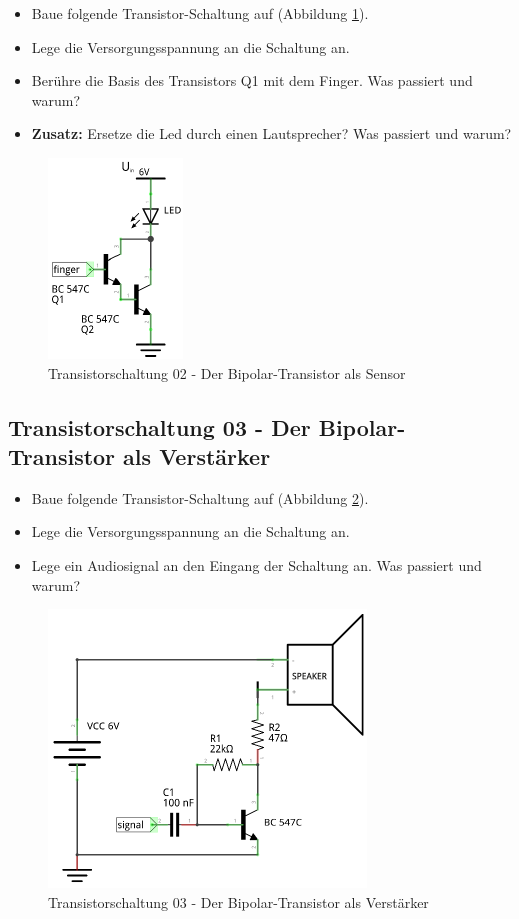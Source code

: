 \begin{itemize}
\itemsep1pt\parskip0pt
\item Baue folgende Transistor-Schaltung auf (Abbildung \ref{s02}). 
\item Lege die Versorgungsspannung an die Schaltung an.
\item Berühre die Basis des Transistors Q1 mit dem Finger. Was passiert und warum?
\item \textbf{Zusatz:} Ersetze die Led durch einen Lautsprecher? Was passiert und warum?
\end{itemize}

\begin{figure}[H]
	\centering
	\includegraphics[scale=1.6]{Transistor/Schaltungen/NPN_Sensor.pdf}
	\caption{Transistorschaltung 02 - Der Bipolar-Transistor als Sensor}
	\label{s02}
\end{figure}


\subsection*{Transistorschaltung 03 - Der Bipolar-Transistor als Verstärker}

\begin{itemize}
\itemsep1pt\parskip0pt
\item Baue folgende Transistor-Schaltung auf (Abbildung \ref{s03}). 
\item Lege die Versorgungsspannung an die Schaltung an.
\item Lege ein Audiosignal an den Eingang der Schaltung an. Was passiert und warum?
\end{itemize}

\begin{figure}[H]
	\centering
	\includegraphics[scale=1.6]{Transistor/Schaltungen/NPN_Verstaerker.pdf}
	\caption{Transistorschaltung 03 - Der Bipolar-Transistor als Verstärker}
	\label{s03}
\end{figure}
